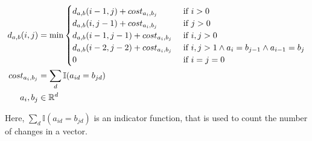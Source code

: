 \documentclass[./../../paper.tex]{subfiles}
\begin{document}
\begin{align}
    \label{eq:sparcity}
    d_{a, b}(i, j) & =\min
    \begin{cases}
        d_{a, b}(i-1, j  )+cost_{a_i, b_j} & \text { if } i>0                                            \\
        d_{a, b}(i  , j-1)+cost_{a_i, b_j} & \text { if } j>0                                            \\
        d_{a, b}(i-1, j-1)+cost_{a_i, b_j} & \text { if } i, j>0                                         \\
        d_{a, b}(i-2, j-2)+cost_{a_i, b_j} & \text { if } i, j>1 \land a_{i}=b_{j-1} \land a_{i-1}=b_{j} \\
        0                                 & \text { if } i=j=0                                          
    \end{cases}                             \\
    cost_{a_i, b_j}      & = \sum_d \mathbb{I}(a_{id} = b_{jd}) \\
    a_i,b_j        & \in \mathbb{R}^d
\end{align}

\noindent Here, $\sum_d \mathbb{I}(a_{id} = b_{jd})$ is an indicator function, that is used to count the number of changes in a vector.




\end{document}

